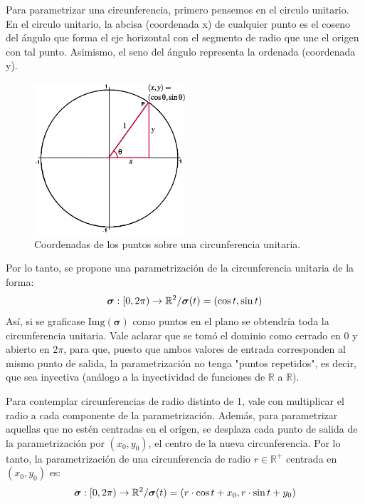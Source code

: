\begin{definition}[Parametrización]
    \begin{example}
        Para parametrizar una circunferencia, primero pensemos en el circulo unitario.
        En el circulo unitario, la abcisa (coordenada x) de cualquier punto es el coseno del ángulo que forma el eje horizontal con el segmento de radio
        que une el origen con tal punto. Asimismo, el seno del ángulo representa la ordenada (coordenada y).
        \begin{figure}[H] 
            \centering
            \includegraphics[width=0.5\textwidth]{../figs/unitCircle1.png} %
            \caption{Coordenadas de los puntos sobre una circunferencia unitaria.}
            \label{fig:unitCircle1} %
        \end{figure}
        Por lo tanto, se propone una parametrización de la circunferencia unitaria de la forma:
        \begin{equation*}
            \boldsymbol{\sigma}:[0,2\pi)\rightarrow\mathbb{R}^2/ \\ \boldsymbol{\sigma}(t)=(\cos{t},\sin{t})
        \end{equation*}
        Así, si se graficase $\text{Img}(\boldsymbol{\sigma})$ como puntos en el plano se obtendría toda la circunferencia unitaria.
        Vale aclarar que se tomó el dominio como cerrado en $0$ y abierto en $2\pi$, para que, puesto que ambos valores de 
        entrada corresponden al mismo punto de salida, la parametrización no tenga "puntos repetidos", es decir, que sea inyectiva 
        (análogo a la inyectividad de funciones de $\mathbb{R}$ a $\mathbb{R}$).

        Para contemplar circunferencias de radio distinto de 1, vale con multiplicar el radio a cada componente de la parametrización.
        Además, para parametrizar aquellas que no estén centradas en el orígen, se desplaza cada punto de salida de la
        parametrización por $(x_0,y_0)$, el centro de la nueva circunferencia.
        Por lo tanto, la parametrización de una circunferencia de radio $r\in\mathbb{R}^+$ centrada en $(x_0,y_0)$ es:
        \begin{equation*}
            \boldsymbol{\sigma}:[0,2\pi)\rightarrow\mathbb{R}^2/ \\ \boldsymbol{\sigma}(t)=(r\cdot\cos{t}+x_0,r\cdot\sin{t}+y_0)
        \end{equation*} 
    \end{example}
\end{definition}